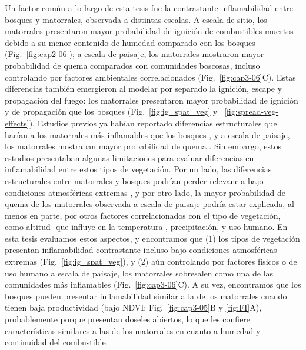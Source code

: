 Un factor común a lo largo de esta tesis fue la contrastante inflamabilidad entre bosques y matorrales, observada a distintas escalas. A escala de sitio, los matorrales presentaron mayor probabilidad de ignición de combustibles muertos debido a su menor contenido de humedad comparado con los bosques (Fig.~\ref{fig:cap2-06}); a escala de paisaje, los matorrales mostraron mayor probabilidad de quema comparados con comunidades boscosas, incluso controlando por factores ambientales correlacionados (Fig.~\ref{fig:cap3-06}C). Estas diferencias también emergieron al modelar por separado la ignición, escape y propagación del fuego: los matorrales presentaron mayor probabilidad de ignición y de propagación que los bosques (Fig.~\ref{fig:ig_spat_veg} y ~\ref{fig:spread-veg-effects}). Estudios previos ya habían reportado diferencias estructurales que harían a los matorrales más inflamables que los bosques \citep{paritsis_positive_2015, blackhall_effects_2017, tiribelli_changes_2018}, y a escala de paisaje, los matorrales mostraban mayor probabilidad de quema \citep{mermoz_landscape_2005, paritsis_habitat_2013, morales_stochastic_2015}. Sin embargo, estos estudios presentaban algunas limitaciones para evaluar diferencias en inflamabilidad entre estos tipos de vegetación. Por un lado, las diferencias estructurales entre matorrales y bosques podrían perder relevancia bajo condiciones atmosféricas extremas \citep{Podur2009, Parks2015, Collins2019, jones_extreme_2023}, y por otro lado, la mayor probabilidad de quema de los matorrales observada a escala de paisaje podría estar explicada, al menos en parte, por otros factores correlacionados con el tipo de vegetación, como altitud -que influye en la temperatura-, precipitación, y uso humano. En esta tesis evaluamos estos aspectos, y encontramos que (1) los tipos de vegetación presentan inflamabilidad contrastante incluso bajo condiciones atmosféricas extremas (Fig.~\ref{fig:ig_spat_veg}), y (2) aún controlando por factores físicos o de uso humano a escala de paisaje, los matorrales sobresalen como una de las comunidades más inflamables (Fig.~\ref{fig:cap3-06}C). A su vez, encontramos que los bosques pueden presentar inflamabilidad similar a la de los matorrales cuando tienen baja productividad (bajo NDVI; Fig.~\ref{fig:cap3-05}B y \ref{fig:FI}A), probablemente porque presentan doseles abiertos, lo que les confiere características similares a las de los matorrales en cuanto a humedad y continuidad del combustible. 


